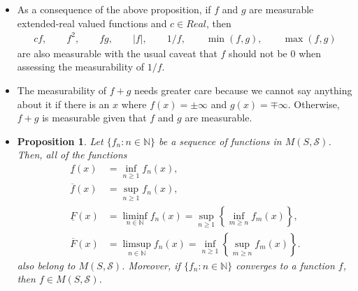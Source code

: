 \documentclass[10pt]{article}
\newtheorem{proposition}[lemma]{Proposition}
\numberwithin{lemma}{section}
\newcommand{\mcal}[1]{\mathcal{#1}}
\newcommand{\Nat}{\mathbb{N}}
\begin{document}
\begin{itemize}
  \item As a consequence of the above proposition, if $f$ and $g$ are measurable extended-real valued functions and $c \in Real$, then
  \begin{align*}
    cf, \qquad f^2, \qquad fg, \qquad |f|, \qquad 1/f, \qquad \min(f,g), \qquad \max(f,g)
  \end{align*}
  are also measurable with the usual caveat that $f$ should not be $0$ when assessing the measurability of $1/f$.

  \item The measurability of $f+g$ needs greater care because we cannot say anything about it if there is an $x$ where $f(x) = \pm\infty$ and $g(x) = \mp\infty$. Otherwise, $f+g$ is measurable given that $f$ and $g$ are measurable.
  
  \item \begin{proposition}
    Let $\{ f_n : n \in \Nat \}$ be a sequence of functions in $M(S,\mcal{S})$. Then, all of the functions
    \begin{align*}
      \underline{f}(x) &= \inf_{n \geq 1} f_n(x),\\
      \overline{f}(x) &= \sup_{n \geq 1} f_n(x), \\
      \underline{F}(x) &= \liminf_{n \in \Nat} f_n(x) = \sup_{n \geq 1} \left\{ \inf_{m \geq n} f_m(x) \right\}, \\
      \overline{F}(x) &= \limsup_{n \in \Nat} f_n(x) = \inf_{n \geq 1} \left\{ \sup_{m \geq n} f_m(x) \right\}.
    \end{align*}
    also belong to $M(S,\mcal{S})$. Moreover, if $\{ f_n : n \in \Nat \}$ converges to a function $f$, then $f \in M(S,\mcal{S})$.
  \end{proposition}
\end{itemize}
\end{document}
